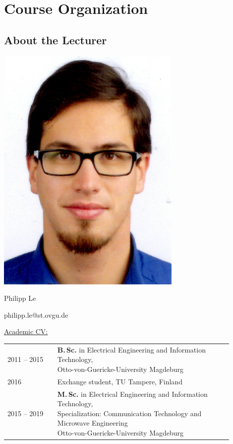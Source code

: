 \chapter{Course Organization}

\section{About the Lecturer}

\begin{minipage}{0.2\linewidth}
	\includegraphics[width=0.8\linewidth]{../chapter00/Philipp.jpg}
\end{minipage}
\hfill
\begin{minipage}{0.75\linewidth}
	Philipp Le
	
	philipp.le@st.ovgu.de
\end{minipage}

\vspace{1em}

\underline{Academic CV:}

\begin{tabular}{p{0.2\linewidth}p{0.7\linewidth}}
	2011 -- 2015 & \makecell[l]{\textbf{B.\,Sc.} in Electrical Engineering and Information Technology,\\ Otto-von-Guericke-University Magdeburg} \\[1.5em]
	2016 & Exchange student, TU Tampere, Finland\\[0.5em]
	2015 -- 2019 & \makecell[l]{\textbf{M.\,Sc.} in Electrical Engineering and Information Technology,\\ Specialization: Communication Technology and Microwave Engineering\\ Otto-von-Guericke-University Magdeburg} \\[0.5em]
\end{tabular}

